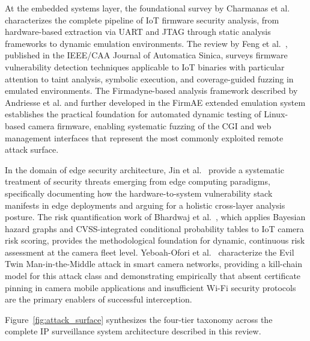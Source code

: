 \documentclass[letterpaper, 10pt, conference]{ieeeconf}
\begin{document}
At the embedded systems layer, the foundational survey by Charmanas
et al.~\cite{charmanas2023} characterizes the complete pipeline of IoT
firmware security analysis, from hardware-based extraction via UART
and JTAG through static analysis frameworks to dynamic emulation
environments. The review by Feng et al.~\cite{feng2023}, published
in the IEEE/CAA Journal of Automatica Sinica, surveys firmware
vulnerability detection techniques applicable to IoT binaries with
particular attention to taint analysis, symbolic execution, and
coverage-guided fuzzing in emulated environments. The Firmadyne-based
analysis framework described by Andriesse et al. and further developed
in the FirmAE extended emulation system \cite{firmae2020} establishes
the practical foundation for automated dynamic testing of Linux-based
camera firmware, enabling systematic fuzzing of the CGI and web
management interfaces that represent the most commonly exploited
remote attack surface.

In the domain of edge security architecture, Jin et al.~\cite{jin2022edge}
provide a systematic treatment of security threats emerging from edge
computing paradigms, specifically documenting how the hardware-to-system
vulnerability stack manifests in edge deployments and arguing for a
holistic cross-layer analysis posture. The risk quantification work
of Bhardwaj et al.~\cite{bhardwaj2024}, which applies Bayesian hazard
graphs and CVSS-integrated conditional probability tables to IoT camera
risk scoring, provides the methodological foundation for dynamic,
continuous risk assessment at the camera fleet level. Yeboah-Ofori
et al.~\cite{yeboah2023} characterize the Evil Twin Man-in-the-Middle
attack in smart camera networks, providing a kill-chain model for
this attack class and demonstrating empirically that absent certificate
pinning in camera mobile applications and insufficient Wi-Fi security
protocols are the primary enablers of successful interception.

Figure~\ref{fig:attack_surface} synthesizes the four-tier taxonomy
across the complete IP surveillance system architecture described in
this review.

\end{document}
